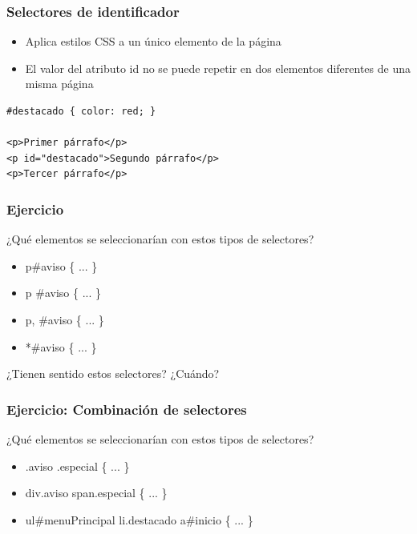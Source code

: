 
\begin{frame}[fragile]
\frametitle{Selectores de identificador}

\begin{itemize}
  \item Aplica estilos CSS a un único elemento de la página
  \item El valor del atributo id no se puede repetir en dos elementos diferentes de una misma página
\end{itemize}

\begin{verbatim}
#destacado { color: red; }
 
<p>Primer párrafo</p>
<p id="destacado">Segundo párrafo</p>
<p>Tercer párrafo</p>
\end{verbatim}

\end{frame}



\begin{frame}
\frametitle{Ejercicio}

¿Qué elementos se seleccionarían con estos tipos de selectores?

\begin{itemize}
  \item p\#aviso \{ ... \}
  \item p \#aviso \{ ... \}
  \item p, \#aviso \{ ... \}
  \item *\#aviso \{ ... \}
\end{itemize}

¿Tienen sentido estos selectores? ¿Cuándo?

\end{frame}


\begin{frame}
\frametitle{Ejercicio: Combinación de selectores}

¿Qué elementos se seleccionarían con estos tipos de selectores?

\begin{itemize}
  \item .aviso .especial \{ ... \}
  \item div.aviso span.especial \{ ... \}
  \item ul\#menuPrincipal li.destacado a\#inicio \{ ... \}
\end{itemize}

\end{frame}

